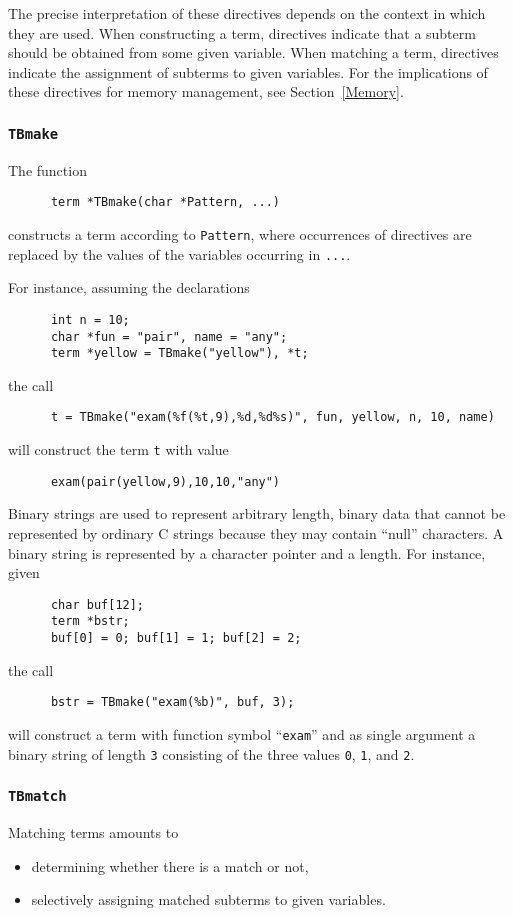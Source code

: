 The precise interpretation of these directives depends on the context
in which they are used.  When constructing a term, directives indicate
that a subterm should be obtained from some given variable.  When
matching a term, directives indicate the assignment of subterms to
given variables.
For the implications of these directives for memory management,
see Section~\ref{Memory}.

\subsubsection{\label{TBmake}{\tt TBmake}}
The function
\begin{verbatim}
      term *TBmake(char *Pattern, ...)
\end{verbatim}
constructs a term according to {\tt Pattern}, where occurrences of
directives are replaced by the values of the variables
occurring in {\tt ...}.

For instance, assuming the declarations
\begin{verbatim}
      int n = 10;
      char *fun = "pair", name = "any";
      term *yellow = TBmake("yellow"), *t;
\end{verbatim}
the call
\begin{verbatim}
      t = TBmake("exam(%f(%t,9),%d,%d%s)", fun, yellow, n, 10, name)
\end{verbatim}
will construct the term {\tt t} with value
\begin{verbatim}
      exam(pair(yellow,9),10,10,"any")
\end{verbatim}

Binary strings are used to represent arbitrary length, binary data
that cannot be represented by ordinary C strings because they may
contain ``null'' characters. A binary string is represented by
a character pointer and a length. For instance, given
\begin{verbatim}
      char buf[12];
      term *bstr;
      buf[0] = 0; buf[1] = 1; buf[2] = 2;
\end{verbatim}
the call
\begin{verbatim}
      bstr = TBmake("exam(%b)", buf, 3);
\end{verbatim}
will construct a term with function symbol ``{\tt exam}'' and as single
argument a binary string of length {\tt 3} consisting of the three
values {\tt 0}, {\tt 1}, and {\tt 2}.

\subsubsection{\label{TBmatch}{\tt TBmatch}}
Matching terms amounts to
\begin{itemize}
\item determining whether there is a match or not,
\item selectively assigning matched subterms to given variables.
\end{itemize}

